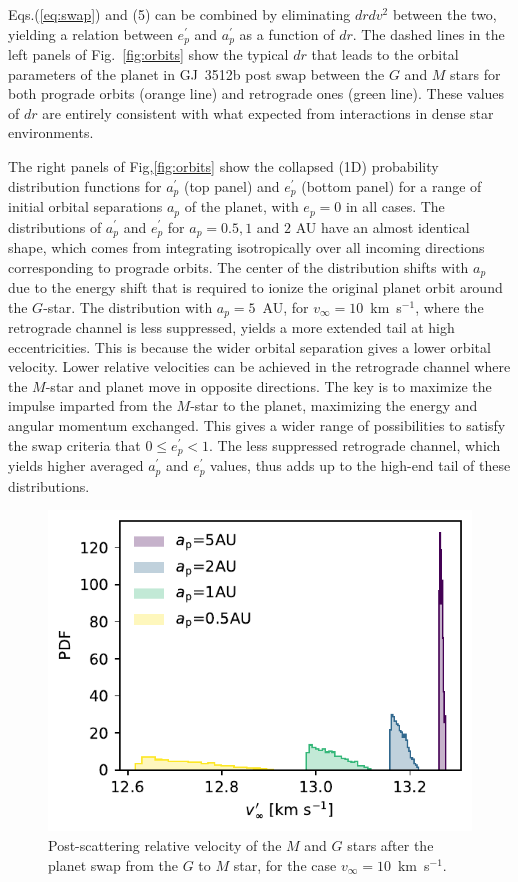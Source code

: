 \documentclass[twocolumn]{aastex62}
\begin{document}
Eqs.(\ref{eq:swap}) and (5) can be combined by eliminating $drdv^2$ between the two, yielding a relation  between $e_p^\prime$ 
and $a_p^\prime$ as a function of $dr$. The dashed lines in the left panels of Fig.~\ref{fig:orbits} show the typical $dr$ that leads to the orbital parameters of the planet in GJ~3512b post swap between the $G$ and $M$ stars for both prograde orbits (orange line) and retrograde ones (green line). 
These values of $dr$ are entirely consistent with what expected from interactions in dense star environments.



The right panels of Fig,\ref{fig:orbits} show the collapsed (1D) probability distribution functions for $a_p^\prime$ (top panel) 
and $e_p^\prime$ (bottom panel) for a range of initial orbital separations $a_p$ of the planet, with $e_p=0$ in all cases. The distributions of $a_p^\prime$ and $e_p^\prime$  for $a_p=0.5,1$ and $2$ AU have an almost identical shape, which comes from integrating isotropically over all incoming directions corresponding to prograde orbits. 
The center of the distribution shifts with $a_p$ due to the energy shift that is required to ionize the original planet orbit around the $G$-star. The distribution with $a_p=5$~AU,  for $v_\infty=10$~km~s$^{-1}$, where the retrograde channel is less suppressed, yields a more extended tail at high eccentricities. This is because the wider orbital separation gives a lower orbital velocity. Lower relative velocities can be achieved in the retrograde channel where the $M$-star and planet move in opposite directions. The key is to maximize the impulse imparted from the $M$-star to the planet, maximizing the energy and angular momentum exchanged.  This gives a wider range of possibilities  to satisfy the swap criteria that $0 \le e_p^\prime < 1$. The less suppressed retrograde channel,  which yields higher averaged $a_p^\prime$ and $e_p^\prime$ values, thus adds up to the high-end tail of these distributions.  


\begin{figure}
  \includegraphics[width=0.9\columnwidth]{letter-v}
  \caption{Post-scattering relative velocity of the $M$ and  $G$ stars after the planet swap from the  $G$ to $M$ star, for the case 
   $v_\infty=10$~km~s$^{-1}$.}
 \label{fig:velocity}
\end{figure}
\end{document}
